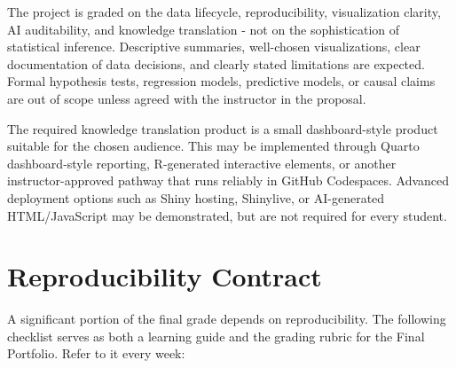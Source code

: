 \documentclass[
  letterpaper,
  DIV=11,
  numbers=noendperiod,
  oneside]{scrreprt}
\begin{document}
\begin{tcolorbox}[colback=brandlight!5!white, colframe=brandblue, title=\textbf{Analytic Scope of the Term Project}, arc=2mm]
The project is graded on the data lifecycle, reproducibility, visualization clarity, AI auditability, and knowledge translation - not on the sophistication of statistical inference. Descriptive summaries, well-chosen visualizations, clear documentation of data decisions, and clearly stated limitations are expected. Formal hypothesis tests, regression models, predictive models, or causal claims are out of scope unless agreed with the instructor in the proposal.

The required knowledge translation product is a small dashboard-style product suitable for the chosen audience. This may be implemented through Quarto dashboard-style reporting, R-generated interactive elements, or another instructor-approved pathway that runs reliably in GitHub Codespaces. Advanced deployment options such as Shiny hosting, Shinylive, or AI-generated HTML/JavaScript may be demonstrated, but are not required for every student.
\end{tcolorbox}

\section{Reproducibility Contract}\label{reproducibility-contract}

\begin{tcolorbox}[colback=brandlight!5!white, colframe=brandblue, title=\textbf{The Reproducibility Checklist}, arc=2mm]
A significant portion of the final grade depends on reproducibility. The following checklist serves as both a learning guide and the grading rubric for the Final Portfolio. Refer to it every week:
\end{tcolorbox}
\end{document}
